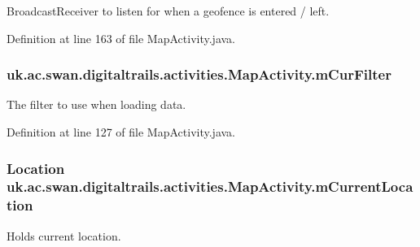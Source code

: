 Broadcast\+Receiver to listen for when a geofence is entered / left. 



Definition at line 163 of file Map\+Activity.\+java.

\hypertarget{classuk_1_1ac_1_1swan_1_1digitaltrails_1_1activities_1_1_map_activity_a554023fa57db99ba95741de26b0ce17b}{
\subsubsection[{m\+Cur\+Filter}]{ uk.\+ac.\+swan.\+digitaltrails.\+activities.\+Map\+Activity.\+m\+Cur\+Filter\hspace{0.3cm}{\ttfamily [private]}}}\label{classuk_1_1ac_1_1swan_1_1digitaltrails_1_1activities_1_1_map_activity_a554023fa57db99ba95741de26b0ce17b}


The filter to use when loading data. 



Definition at line 127 of file Map\+Activity.\+java.

\hypertarget{classuk_1_1ac_1_1swan_1_1digitaltrails_1_1activities_1_1_map_activity_a6bee4f44af3d6931f7a9d418b59b6262}{
\subsubsection[{m\+Current\+Location}]{\setlength{\rightskip}{0pt plus 5cm}Location uk.\+ac.\+swan.\+digitaltrails.\+activities.\+Map\+Activity.\+m\+Current\+Location\hspace{0.3cm}{\ttfamily [private]}}}\label{classuk_1_1ac_1_1swan_1_1digitaltrails_1_1activities_1_1_map_activity_a6bee4f44af3d6931f7a9d418b59b6262}


Holds current location. 



